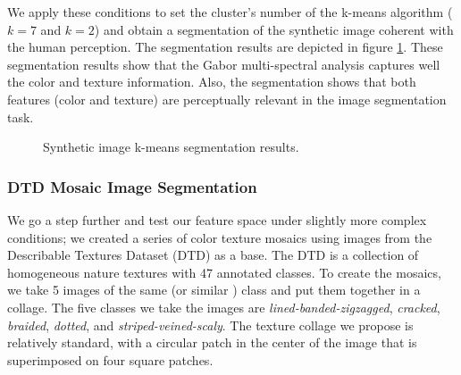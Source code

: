 \documentclass[journal]{IEEEtran}
\begin{document}
We apply these conditions to set the cluster's number of the k-means algorithm ($k = 7$ and $k = 2$) and obtain a segmentation of the synthetic image coherent with the human perception. The segmentation results are depicted in figure  \ref{fig:kmeans_segms_synthetic_img}. These segmentation results show that the Gabor multi-spectral analysis captures well the color and texture information. Also, the segmentation shows that both features (color and texture) are perceptually relevant in the image segmentation task.  

%        	    

\begin{figure}[!t]
\centering
{}
\hfil
{}
\caption{Synthetic image k-means segmentation results.}\label{fig:kmeans_segms_synthetic_img}   
\end{figure}

\subsubsection{DTD Mosaic Image Segmentation}
We go a step further and test our feature space under slightly more complex conditions; we created a series of color texture mosaics using images from the Describable Textures Dataset (DTD) \cite{Cimpoi.Maji.ea:CVPR:2014} as a base. The DTD is a collection of homogeneous nature textures with 47 annotated classes. To create the mosaics, we take 5 images of the same (or similar ) class and put them together in a collage. The five classes we take the images are \textit{lined-banded-zigzagged}, \textit{cracked}, \textit{braided}, \textit{dotted}, and \textit{striped-veined-scaly}. The texture collage we propose is relatively standard, with a circular patch in the center of the image that is superimposed on four square patches. 
\end{document}
